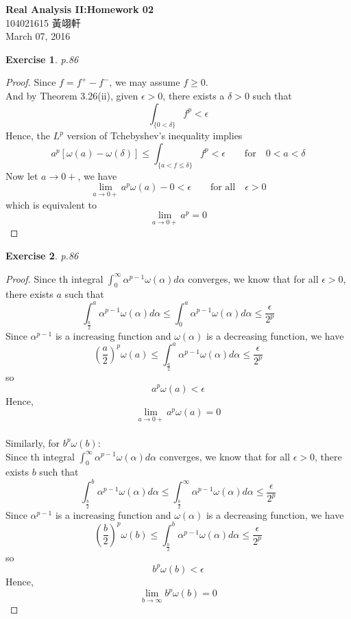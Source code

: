 \documentclass[11pt,a4paper]{article}
\newcommand{\alp}{\alpha}
\renewcommand{\(}{\left(}
\renewcommand{\)}{\right)}
\renewcommand{\[}{\left[}
\renewcommand{\]}{\right]}
\renewcommand{\title}{Real Analysis II:\quad Homework 02}
\renewcommand{\author}{104021615 黃翊軒}
\renewcommand{\maketitle}{\begin{center}\textbf{\Large\title}\\[6pt] {\author}\\[6pt] {\color{Gray}\footnotesize March 07, 2016}\end{center}}
\newtheorem{exercise}{Exercise}
\begin{document}
  \maketitle
  
  
  \setcounter{exercise}{13}
  
  \begin{exercise}
  	p.86
  \end{exercise}
  \begin{proof}
  	Since $f = f^+ - f^-$, we may assume $f \ge 0$.\\
  	And by Theorem 3.26(ii), given $\epsilon >0$, there exists a $\delta >0$ such that $$\int_{\{0<\delta\}}f^p<\epsilon$$
  	Hence, the $L^p$ version of Tchebyshev's
  	inequality implies 
  	$$a^p\[\omega(a)-\omega(\delta)\]\le \int_{\{a<f\le \delta\}}f^p<\epsilon \qquad \text{for}\quad 0<a<\delta$$
  	Now let $a\rightarrow 0+$, we have
  	$$\lim_{a\rightarrow 0+}a^p\omega(a) - 0 < \epsilon \qquad \text{for all} \quad \epsilon>0$$  	
  	which is equivalent to
  	$$\lim_{a\rightarrow 0+}a^p = 0$$
  \end{proof}

  \begin{exercise}
  	p.86
  \end{exercise}
  \begin{proof}
  	Since th integral $\int_{0}^{\infty}\alpha^{p-1}\omega(\alp)d\alp$ converges, we know that for all $\epsilon>0$, there exists $a$ such that 
  	$$\int_{\frac{a}{2}}^{a}\alpha^{p-1}\omega(\alp)d\alp \le \int_{0}^{a}\alpha^{p-1}\omega(\alp)d\alp \le \frac{\epsilon}{2^p}$$
  	Since $\alp^{p-1}$ is a increasing function and  $\omega(\alp)$ is a decreasing function, we have
  	$$(\frac{a}{2})^p\omega(a)\le \int_{\frac{a}{2}}^{a}\alpha^{p-1}\omega(\alp)d\alp \le \frac{\epsilon}{2^p}$$
  	so 
  	$$a^p\omega(a)<\epsilon$$
  	Hence, $$\lim_{a \rightarrow 0+}a^p\omega(a)=0$$\\
  	Similarly, for $b^p\omega(b):$\\
  	Since th integral $\int_{0}^{\infty}\alpha^{p-1}\omega(\alp)d\alp$ converges, we know that for all $\epsilon>0$, there exists $b$ such that
  	$$\int_{\frac{b}{2}}^{b}\alpha^{p-1}\omega(\alp)d\alp \le \int_{\frac{b}{2}}^{\infty}\alpha^{p-1}\omega(\alp)d\alp \le \frac{\epsilon}{2^p}$$
  	Since $\alp^{p-1}$ is a increasing function and  $\omega(\alp)$ is a decreasing function, we have
  	$$(\frac{b}{2})^p\omega(b)\le \int_{\frac{b}{2}}^{b}\alpha^{p-1}\omega(\alp)d\alp \le \frac{\epsilon}{2^p}$$
  	so 
  	$$b^p\omega(b)<\epsilon$$
  	Hence, $$\lim_{b \rightarrow \infty}b^p\omega(b)=0$$
  \end{proof}
\end{document}
